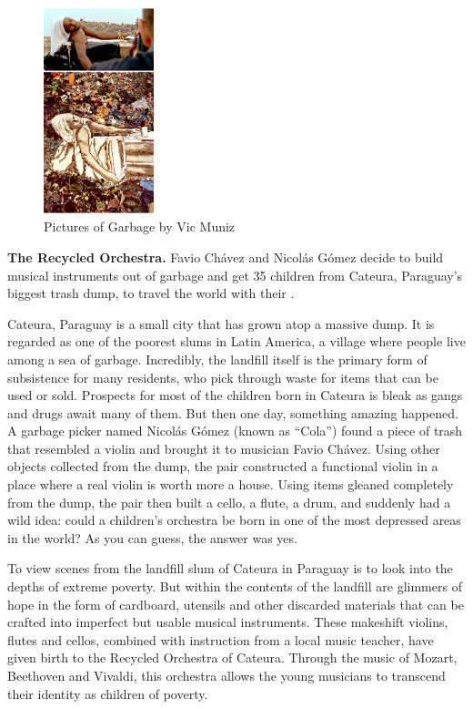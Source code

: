 \begin{figure}[h!]
  \centering
  \includegraphics[height=6cm]{graphics/vik-muniz-picturesofgarbage0.jpg}
  \caption{Pictures of Garbage by Vic Muniz}
  \label{fig:VicMuniz_PicturesOfGarbage}
\end{figure}





%
%
\textbf{The Recycled Orchestra.} Favio Chávez and Nicolás Gómez decide to build musical instruments out of garbage and get 35 children from Cateura, Paraguay’s biggest trash dump, to travel the world with their . 

Cateura, Paraguay is a small city that has grown atop a massive dump. It is regarded as one of the poorest slums in Latin America, a village where people live among a sea of garbage. Incredibly, the landfill itself is the primary form of subsistence for many residents, who pick through waste for items that can be used or sold. Prospects for most of the children born in Cateura is bleak as gangs and drugs await many of them. But then one day, something amazing happened. A garbage picker named Nicolás Gómez (known as “Cola”) found a piece of trash that resembled a violin and brought it to musician Favio Chávez. Using other objects collected from the dump, the pair constructed a functional violin in a place where a real violin is worth more a house. Using items gleaned completely from the dump, the pair then built a cello, a flute, a drum, and suddenly had a wild idea: could a children’s orchestra be born in one of the most depressed areas in the world? As you can guess, the answer was yes.

To view scenes from the landfill slum of Cateura in Paraguay is to look into the depths of extreme poverty. But within the contents of the landfill are glimmers of hope in the form of cardboard, utensils and other discarded materials that can be crafted into imperfect but usable musical instruments. These makeshift violins, flutes and cellos, combined with instruction from a local music teacher, have given birth to the Recycled Orchestra of Cateura. Through the music of Mozart, Beethoven and Vivaldi, this orchestra allows the young musicians to transcend their identity as children of poverty.

